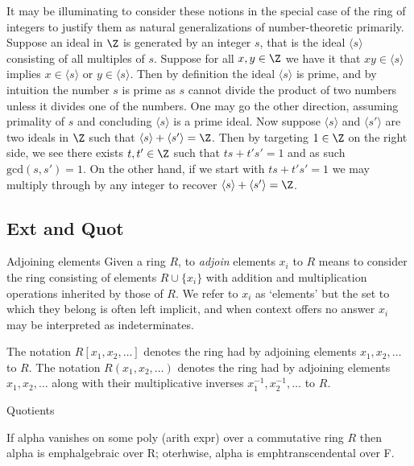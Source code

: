 It may be illuminating to consider these notions in the special case of the ring of integers to justify them as natural generalizations of number-theoretic primarily.
Suppose an ideal in $\Z$ is generated by an integer $s$, that is the ideal $\langle s\rangle$ consisting of all multiples of $s$.
Suppose for all $x,y\in\Z$ we have it that $xy\in\langle s\rangle$ implies $x\in\langle s\rangle$ or $y\in\langle s\rangle$.
Then by definition the ideal $\langle s\rangle$ is prime, and by intuition the number $s$ is prime as $s$ cannot divide the product of two numbers unless it divides one of the numbers.
One may go the other direction, assuming primality of $s$ and concluding $\langle s\rangle$ is a prime ideal.
Now suppose $\langle s\rangle$ and $\langle s'\rangle$ are two ideals in $\Z$ such that $\langle s\rangle+\langle s'\rangle=\Z$.
Then by targeting $1\in\Z$ on the right side, we see there exists $t,t'\in\Z$ such that $ts+t's'=1$ and as such $\text{gcd}(s,s')=1$.
On the other hand, if we start with $ts+t's'=1$ we may multiply through by any integer to recover $\langle s\rangle+\langle s'\rangle=\Z$.




\subsection{Ext and Quot}

\begin{definition}{Adjoining elements}
    Given a ring $R$, to \emph{adjoin} elements $x_i$ to $R$ means to consider the ring consisting of elements $R\cup\{x_i\}$ with addition and multiplication operations inherited by those of $R$.
    We refer to $x_i$ as `elements' but the set to which they belong is often left implicit, and when context offers no answer $x_i$ may be interpreted as indeterminates.

    The notation $R[x_1,x_2,\dots]$ denotes the ring had by adjoining elements $x_1,x_2,\dots$ to $R$.
    The notation $R(x_1,x_2,\dots)$ denotes the ring had by adjoining elements $x_1,x_2,\dots$ along with their multiplicative inverses $x_1^{-1},x_2^{-1},\dots$ to $R$.
\end{definition}

\begin{definition}{Quotients}
    
\end{definition}

If alpha vanishes on some poly (arith expr) over a commutative ring $R$ then alpha is emph{algebraic} over R; oterhwise, alpha is emph{transcendental} over F.


